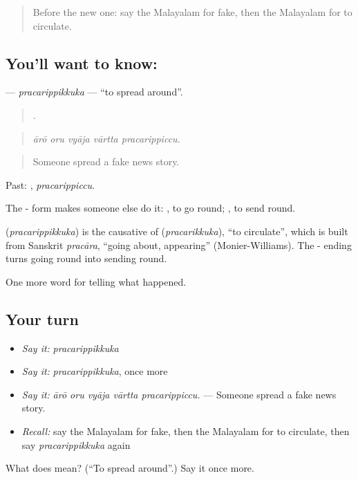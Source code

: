 \begin{quote}
Before the new one: say the Malayalam for fake, then the Malayalam for to circulate.
\end{quote}

\subsection*{You'll want to know: }
\textbf{} — \emph{pracarippikkuka} — \textquotedblleft{}to spread around\textquotedblright{}.

\begin{quote}
    .
\end{quote}

\begin{quote}
\emph{ārō oru vyāja vārtta pracarippiccu.}
\end{quote}

\begin{quote}
Someone spread a fake news story.
\end{quote}

Past: , \emph{pracarippiccu}.

The - form makes someone else do it: , to go round; , to send round.

\begin{cousinweb}
\textbf{} (\emph{pracarippikkuka}) is the causative of  (\emph{pracarikkuka}), \textquotedblleft{}to circulate\textquotedblright{}, which is built from Sanskrit \emph{pracāra}, \textquotedblleft{}going about, appearing\textquotedblright{} (Monier-Williams). The - ending turns going round into sending round.
\end{cousinweb}

\begin{grammarlens}[title={What you've built}]
One more word for telling what happened.
\end{grammarlens}

\subsection*{Your turn}
\begin{itemize}
\raggedright
  \item \emph{Say it:} \emph{pracarippikkuka}
  \item \emph{Say it:} \emph{pracarippikkuka}, once more
  \item \emph{Say it:} \emph{ārō oru vyāja vārtta pracarippiccu.} — Someone spread a fake news story.
  \item \emph{Recall:} say the Malayalam for fake, then the Malayalam for to circulate, then say \emph{pracarippikkuka} again
\end{itemize}

\begin{tcolorbox}[breakable,colback=teal!4,colframe=teal!35!black,title={Before you move on}]
What does  mean? (\textquotedblleft{}To spread around\textquotedblright{}.) Say it once more.
\end{tcolorbox}
